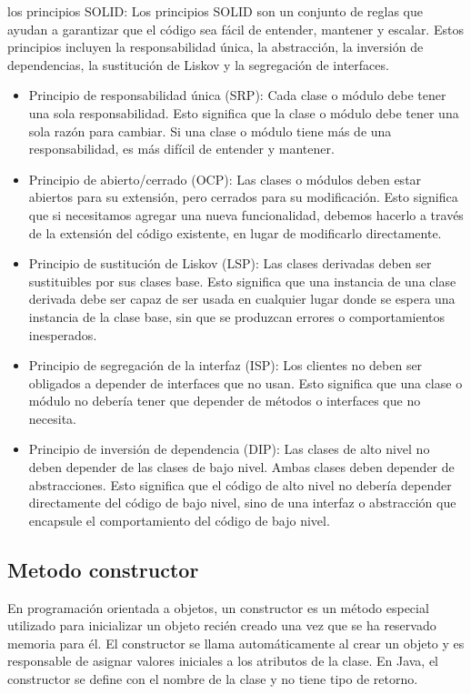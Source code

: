 \documentclass[executivepaper]{article}
\begin{document}
\begin{enumerate}
    los principios SOLID: Los principios SOLID son un conjunto de reglas que ayudan a garantizar que el código sea fácil de entender, mantener y escalar. Estos principios incluyen la responsabilidad única, la abstracción, la inversión de dependencias, la sustitución de Liskov y la segregación de interfaces.
    \begin{itemize}
        \item Principio de responsabilidad única (SRP): Cada clase o módulo debe tener una sola responsabilidad. Esto significa que la clase o módulo debe tener una sola razón para cambiar. Si una clase o módulo tiene más de una responsabilidad, es más difícil de entender y mantener.
        \item Principio de abierto/cerrado (OCP): Las clases o módulos deben estar abiertos para su extensión, pero cerrados para su modificación. Esto significa que si necesitamos agregar una nueva funcionalidad, debemos hacerlo a través de la extensión del código existente, en lugar de modificarlo directamente.
        \item Principio de sustitución de Liskov (LSP): Las clases derivadas deben ser sustituibles por sus clases base. Esto significa que una instancia de una clase derivada debe ser capaz de ser usada en cualquier lugar donde se espera una instancia de la clase base, sin que se produzcan errores o comportamientos inesperados.
        \item Principio de segregación de la interfaz (ISP): Los clientes no deben ser obligados a depender de interfaces que no usan. Esto significa que una clase o módulo no debería tener que depender de métodos o interfaces que no necesita.
        \item Principio de inversión de dependencia (DIP): Las clases de alto nivel no deben depender de las clases de bajo nivel. Ambas clases deben depender de abstracciones. Esto significa que el código de alto nivel no debería depender directamente del código de bajo nivel, sino de una interfaz o abstracción que encapsule el comportamiento del código de bajo nivel.
    \end{itemize}
\end{enumerate}

\subsection{Metodo constructor}
En programación orientada a objetos, un constructor es un método especial utilizado para inicializar un objeto recién creado una vez que se ha reservado memoria para él. El constructor se llama automáticamente al crear un objeto y es responsable de asignar valores iniciales a los atributos de la clase. En Java, el constructor se define con el nombre de la clase y no tiene tipo de retorno.
\end{document}
